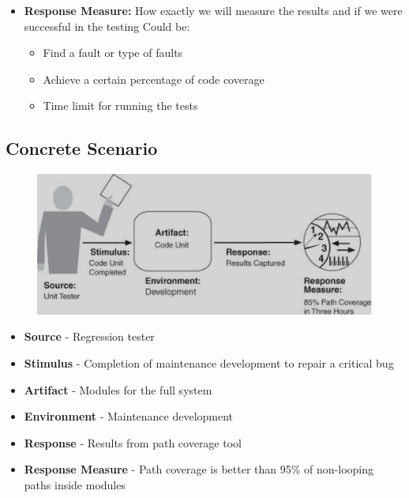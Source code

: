 \documentclass[a4paper]{article}
\begin{document}
\begin{itemize}
\item 
   \textbf{Response Measure:}
   How exactly we will measure the results and if we were successful in the testing
   Could be:
   \begin{itemize}
   \item Find a fault or type of faults
   \item Achieve a certain percentage of code coverage
   \item Time limit for running the tests
   \end{itemize} 
\end{itemize}

\subsection{Concrete Scenario}

\begin{figure}[H]
\begin{center} 
    \includegraphics[scale=0.3]{images/testability-concrete.png}
\end{center}
\end{figure}

\begin{itemize}
\item \textbf{Source} - Regression tester
\item \textbf{Stimulus} - Completion of maintenance development to repair a critical bug
\item \textbf{Artifact} - Modules for the full system
\item \textbf{Environment} - Maintenance development
\item \textbf{Response} - Results from path coverage tool
\item \textbf{Response Measure} - Path coverage is better than 95\% of non-looping paths inside modules
\end{itemize}
\end{document}
